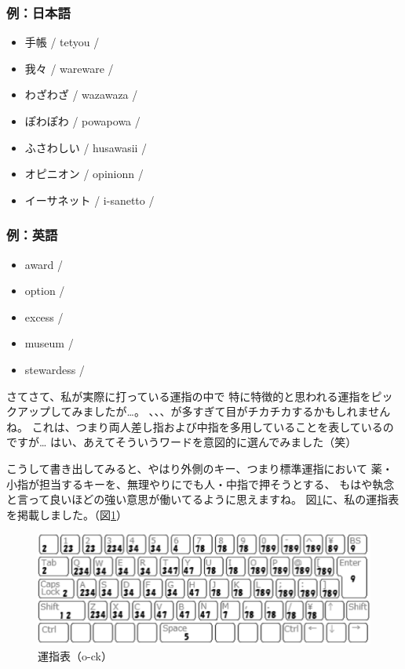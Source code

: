 \subsubsection*{例：日本語}
\begin{itemize}
 \item 手帳 / tetyou / 
 \item 我々 / wareware / 
 \item わざわざ / wazawaza / 
 \item ぽわぽわ / powapowa / 
 \item ふさわしい / husawasii / 
 \item オピニオン / opinionn / 
 \item イーサネット / i-sanetto / 
\end{itemize}
\subsubsection*{例：英語}
\begin{itemize}
 \item award / 
 \item option / 
 \item excess / 
 \item museum / 
 \item stewardess / 
\end{itemize}

さてさて、私が実際に打っている運指の中で
特に特徴的と思われる運指をピックアップしてみましたが…。
、、、が多すぎて目がチカチカするかもしれませんね。
これは、つまり両人差し指および中指を多用していることを表しているのですが…
はい、あえてそういうワードを意図的に選んでみました（笑）


こうして書き出してみると、やはり外側のキー、つまり標準運指において
薬・小指が担当するキーを、無理やりにでも人・中指で押そうとする、
もはや執念と言って良いほどの強い意思が働いてるように思えますね。
図\ref{fig1_unsiock}に、私の運指表を掲載しました。（図\ref{fig1_unsiock}）

\begin{figure}
 \begin{center}
   \includegraphics[width=14cm,clip]{res_o_ck/fig1_unsiock.eps}
 \end{center}
 \caption{運指表（o-ck）}
 \label{fig1_unsiock}
\end{figure}

